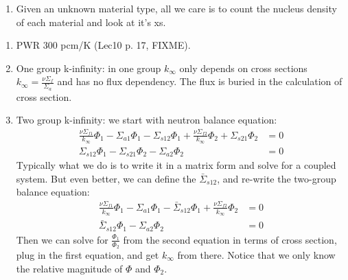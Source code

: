 \documentclass{school-22.211-notes}
\begin{document}
\begin{enumerate}
\item Given an unknown material type, all we care is to count the nucleus density of each material and look at it's xs. 
\end{enumerate}

\begin{enumerate}
\item PWR 300 pcm/K (Lec10 p. 17, FIXME). 


\item One group k-infinity: in one group $k_{\infty}$ only depends on cross sections $k_{\infty} = \frac{\nu \Sigma_f}{\Sigma_a}$ and has no flux dependency. The flux is buried in the calculation of cross section.
\item Two group k-infinity: we start with neutron balance equation:
\begin{align}
\frac{\nu \Sigma_{f1}}{k_{\infty}} \Phi_1 - \Sigma_{a1} \Phi_1 - \Sigma_{s12} \Phi_1 + \frac{\nu \Sigma_{f2}}{k_{\infty}} \Phi_2 + \Sigma_{s21} \Phi_2 &= 0 \\
\Sigma_{s12} \Phi_1 - \Sigma_{s21} \Phi_2 - \Sigma_{a2} \Phi_2 &= 0 
\end{align}
Typically what we do is to write it in a matrix form and solve for a coupled system. But even better, we can define the  $\bar{\Sigma}_{s12}$, and re-write the two-group balance equation: 
\begin{align}
\frac{\nu \Sigma_{f1}}{k_{\infty}} \Phi_1 - \Sigma_{a1} \Phi_1 - \bar{\Sigma}_{s12} \Phi_1 + \frac{\nu \Sigma_{f2}}{k_{\infty}} \Phi_2 &= 0 \\
\bar{\Sigma}_{s12} \Phi_1- \Sigma_{a2} \Phi_2 &= 0 
\end{align}
Then we can solve for $\frac{\Phi_1}{\Phi_2}$ from the second equation in terms of cross section, plug in the first equation, and get $k_{\infty}$ from there. Notice that we only know the relative magnitude of $\Phi$ and $\Phi_2$. 


\end{enumerate}
\end{document}

